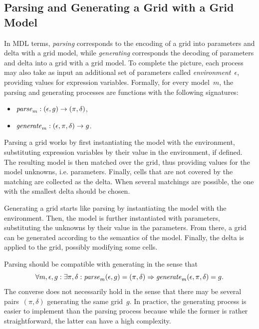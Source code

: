 \documentclass[a4paper]{llncs}
\begin{document}
\subsection{Parsing and Generating a Grid with a Grid Model}
\label{parsing}
\label{generating}


In MDL terms, {\em parsing} corresponds to the encoding of a grid into
parameters and delta with a grid model, while {\em generating}
corresponds the decoding of parameters and delta into a grid with a
grid model. To complete the picture, each process may also take as
input an additional set of parameters called {\em
  environment}~$\epsilon$, providing values for expression variables.
%
Formally, for every model~$m$, the parsing and generating processes
are functions with the following signatures:
\begin{itemize}
\item ${\it parse}_m : (\epsilon, g) \to (\pi, \delta)$,
\item ${\it generate}_m : (\epsilon, \pi, \delta) \to g$.
\end{itemize}

Parsing a grid works by first instantiating the model with the
environment, substituting expression variables by their value in the
environment, if defined. The resulting model is then matched over the
grid, thus providing values for the model unknowns,
i.e. parameters. Finally, cells that are not covered by the matching
are collected as the delta.  When several matchings are possible, the
one with the smallest delta should be chosen.

Generating a grid starts like parsing by instantiating the model with
the environment. Then, the model is further instantiated with
parameters, substituting the unknowns by their value in the
parameters. From there, a grid can be generated according to the
semantics of the model. Finally, the delta is applied to the grid,
possibly modifying some cells.

Parsing should be compatible with generating in the sense that
\[ \forall m, \epsilon, g: \exists \pi, \delta: {\it
    parse}_m(\epsilon,g) = (\pi,\delta) \Rightarrow {\it
    generate}_m(\epsilon,\pi,\delta) = g. \] The converse does not
necessarily hold in the sense that there may be several
pairs~$(\pi,\delta)$ generating the same grid~$g$. In practice, the
generating process is easier to implement than the parsing process
because while the former is rather straightforward, the latter can
have a high complexity.
\end{document}
